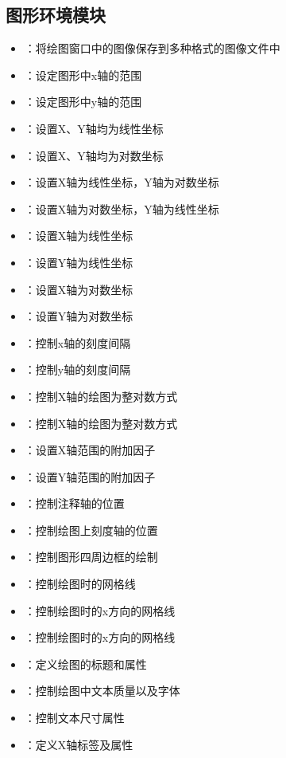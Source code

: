 \subsection*{图形环境模块}
\begin{itemize}
\item {}：将绘图窗口中的图像保存到多种格式的图像文件中
\item {}：设定图形中x轴的范围
\item {}：设定图形中y轴的范围
\item {}：设置X、Y轴均为线性坐标
\item {}：设置X、Y轴均为对数坐标
\item {}：设置X轴为线性坐标，Y轴为对数坐标
\item {}：设置X轴为对数坐标，Y轴为线性坐标
\item {}：设置X轴为线性坐标
\item {}：设置Y轴为线性坐标
\item {}：设置X轴为对数坐标
\item {}：设置Y轴为对数坐标
\item {}：控制x轴的刻度间隔
\item {}：控制y轴的刻度间隔
\item {}：控制X轴的绘图为整对数方式
\item {}：控制X轴的绘图为整对数方式
\item {}：设置X轴范围的附加因子
\item {}：设置Y轴范围的附加因子
\item {}：控制注释轴的位置
\item {}：控制绘图上刻度轴的位置
\item {}：控制图形四周边框的绘制
\item {}：控制绘图时的网格线
\item {}：控制绘图时的x方向的网格线
\item {}：控制绘图时的x方向的网格线
\item {}：定义绘图的标题和属性
\item {}：控制绘图中文本质量以及字体
\item {}：控制文本尺寸属性
\item {}：定义X轴标签及属性

\end{itemize}
